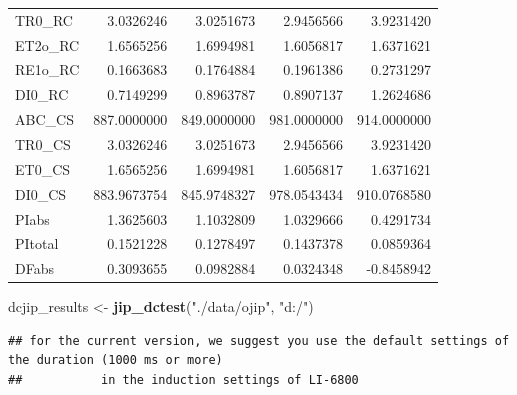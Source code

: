 \documentclass[]{krantz}
\makeatletter
\newenvironment{Shaded}{\begin{snugshade}}{\end{snugshade}}
\newcommand{\KeywordTok}[1]{\textcolor[rgb]{0.13,0.29,0.53}{\textbf{#1}}}
\newcommand{\StringTok}[1]{\textcolor[rgb]{0.31,0.60,0.02}{#1}}
\newcommand{\NormalTok}[1]{#1}
\newenvironment{kframe}{%
\medskip{}
\setlength{\fboxsep}{.8em}
 \def\at@end@of@kframe{}%
 \ifinner\ifhmode%
  \def\at@end@of@kframe{\end{minipage}}%
  \begin{minipage}{\columnwidth}%
 \fi\fi%
 \def\FrameCommand##1{\hskip\@totalleftmargin \hskip-\fboxsep
 \colorbox{shadecolor}{##1}\hskip-\fboxsep
     \hskip-\linewidth \hskip-\@totalleftmargin \hskip\columnwidth}%
 \MakeFramed {\advance\hsize-\width
   \@totalleftmargin\z@ \linewidth\hsize
   \@setminipage}}%
 {\par\unskip\endMakeFramed%
 \at@end@of@kframe}
\renewenvironment{Shaded}{\begin{kframe}}{\end{kframe}}
\theoremstyle{definition}
\theoremstyle{definition}
\theoremstyle{definition}
\theoremstyle{remark}
\makeatother
\begin{document}
\begin{longtable}[t]{lrrrr}
TR0\_RC & 3.0326246 & 3.0251673 & 2.9456566 & 3.9231420\\
ET2o\_RC & 1.6565256 & 1.6994981 & 1.6056817 & 1.6371621\\
\addlinespace
RE1o\_RC & 0.1663683 & 0.1764884 & 0.1961386 & 0.2731297\\
DI0\_RC & 0.7149299 & 0.8963787 & 0.8907137 & 1.2624686\\
ABC\_CS & 887.0000000 & 849.0000000 & 981.0000000 & 914.0000000\\
TR0\_CS & 3.0326246 & 3.0251673 & 2.9456566 & 3.9231420\\
ET0\_CS & 1.6565256 & 1.6994981 & 1.6056817 & 1.6371621\\
\addlinespace
DI0\_CS & 883.9673754 & 845.9748327 & 978.0543434 & 910.0768580\\
PIabs & 1.3625603 & 1.1032809 & 1.0329666 & 0.4291734\\
PItotal & 0.1521228 & 0.1278497 & 0.1437378 & 0.0859364\\
DFabs & 0.3093655 & 0.0982884 & 0.0324348 & -0.8458942\\
\bottomrule
\end{longtable}

\begin{Shaded}
\begin{Highlighting}[]
\NormalTok{dcjip_results <-}\StringTok{ }\KeywordTok{jip_dctest}\NormalTok{(}\StringTok{"./data/ojip"}\NormalTok{, }\StringTok{"d:/"}\NormalTok{)}
\end{Highlighting}
\end{Shaded}

\begin{verbatim}
## for the current version, we suggest you use the default settings of the duration (1000 ms or more)
##           in the induction settings of LI-6800
\end{verbatim}
\end{document}
